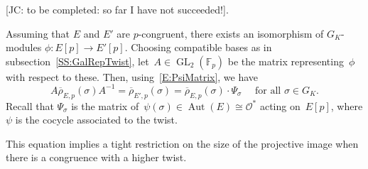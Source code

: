 \documentclass[12pt, reqno]{amsart}
\newcommand{\F}{\mathbb{F}}
\newcommand{\rhobar}{{\overline{\rho}}}
\newcommand{\calO}{\mathcal{O}}
\DeclareMathOperator{\Aut}{Aut}
\newcommand{\GL}{\operatorname{GL}}
\numberwithin{equation}{section}
\theoremstyle{definition}
\theoremstyle{remark}
\newcommand{\jc}[1]{{\color{darkgreen} \textsf{[JC: #1]}}}
\begin{document}
\jc{to be completed: so far I have not succeeded!}.

Assuming that $E$ and $E'$ are $p$-congruent, there exists an
isomorphism of $G_K$-modules $\phi : E[p] \to E'[p]$.  Choosing
compatible bases as in subsection~\ref{SS:GalRepTwist},  let~$A \in
\GL_2(\F_p)$ be the matrix representing~$\phi$ with respect to these.
Then, using~\eqref{E:PsiMatrix}, we have
\begin{equation}\label{E:PsiM}
A \rhobar_{E,p}(\sigma) A^{-1} = \rhobar_{E',p}(\sigma) =
\rhobar_{E,p}(\sigma) \cdot \Psi_\sigma \quad \text{ for all } \sigma
\in G_K.
\end{equation}
Recall that $\Psi_\sigma$ is the matrix of~$\psi(\sigma)\in
\Aut(E)\cong\calO^*$ acting on~$E[p]$, where $\psi$ is the cocycle
associated to the twist.

This equation implies a tight restriction on the size of the
projective image when there is a congruence with a higher twist.
\end{document}
